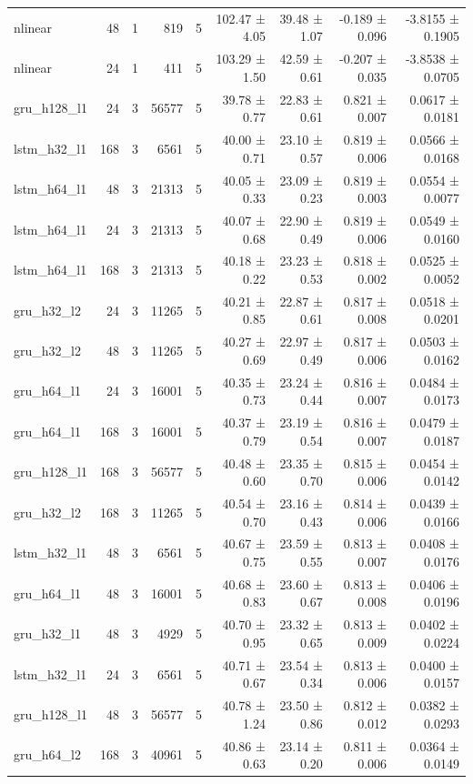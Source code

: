 \begin{table}[htbp]
\begin{tabular}{lrrrrrrrr}
nlinear & 48 & 1 & 819 & 5 & 102.47 ± 4.05 & 39.48 ± 1.07 & -0.189 ± 0.096 & -3.8155 ± 0.1905 \\
nlinear & 24 & 1 & 411 & 5 & 103.29 ± 1.50 & 42.59 ± 0.61 & -0.207 ± 0.035 & -3.8538 ± 0.0705 \\
gru\_h128\_l1 & 24 & 3 & 56577 & 5 & 39.78 ± 0.77 & 22.83 ± 0.61 & 0.821 ± 0.007 & 0.0617 ± 0.0181 \\
lstm\_h32\_l1 & 168 & 3 & 6561 & 5 & 40.00 ± 0.71 & 23.10 ± 0.57 & 0.819 ± 0.006 & 0.0566 ± 0.0168 \\
lstm\_h64\_l1 & 48 & 3 & 21313 & 5 & 40.05 ± 0.33 & 23.09 ± 0.23 & 0.819 ± 0.003 & 0.0554 ± 0.0077 \\
lstm\_h64\_l1 & 24 & 3 & 21313 & 5 & 40.07 ± 0.68 & 22.90 ± 0.49 & 0.819 ± 0.006 & 0.0549 ± 0.0160 \\
lstm\_h64\_l1 & 168 & 3 & 21313 & 5 & 40.18 ± 0.22 & 23.23 ± 0.53 & 0.818 ± 0.002 & 0.0525 ± 0.0052 \\
gru\_h32\_l2 & 24 & 3 & 11265 & 5 & 40.21 ± 0.85 & 22.87 ± 0.61 & 0.817 ± 0.008 & 0.0518 ± 0.0201 \\
gru\_h32\_l2 & 48 & 3 & 11265 & 5 & 40.27 ± 0.69 & 22.97 ± 0.49 & 0.817 ± 0.006 & 0.0503 ± 0.0162 \\
gru\_h64\_l1 & 24 & 3 & 16001 & 5 & 40.35 ± 0.73 & 23.24 ± 0.44 & 0.816 ± 0.007 & 0.0484 ± 0.0173 \\
gru\_h64\_l1 & 168 & 3 & 16001 & 5 & 40.37 ± 0.79 & 23.19 ± 0.54 & 0.816 ± 0.007 & 0.0479 ± 0.0187 \\
gru\_h128\_l1 & 168 & 3 & 56577 & 5 & 40.48 ± 0.60 & 23.35 ± 0.70 & 0.815 ± 0.006 & 0.0454 ± 0.0142 \\
gru\_h32\_l2 & 168 & 3 & 11265 & 5 & 40.54 ± 0.70 & 23.16 ± 0.43 & 0.814 ± 0.006 & 0.0439 ± 0.0166 \\
lstm\_h32\_l1 & 48 & 3 & 6561 & 5 & 40.67 ± 0.75 & 23.59 ± 0.55 & 0.813 ± 0.007 & 0.0408 ± 0.0176 \\
gru\_h64\_l1 & 48 & 3 & 16001 & 5 & 40.68 ± 0.83 & 23.60 ± 0.67 & 0.813 ± 0.008 & 0.0406 ± 0.0196 \\
gru\_h32\_l1 & 48 & 3 & 4929 & 5 & 40.70 ± 0.95 & 23.32 ± 0.65 & 0.813 ± 0.009 & 0.0402 ± 0.0224 \\
lstm\_h32\_l1 & 24 & 3 & 6561 & 5 & 40.71 ± 0.67 & 23.54 ± 0.34 & 0.813 ± 0.006 & 0.0400 ± 0.0157 \\
gru\_h128\_l1 & 48 & 3 & 56577 & 5 & 40.78 ± 1.24 & 23.50 ± 0.86 & 0.812 ± 0.012 & 0.0382 ± 0.0293 \\
gru\_h64\_l2 & 168 & 3 & 40961 & 5 & 40.86 ± 0.63 & 23.14 ± 0.20 & 0.811 ± 0.006 & 0.0364 ± 0.0149 \\

\end{tabular}
\end{table}
